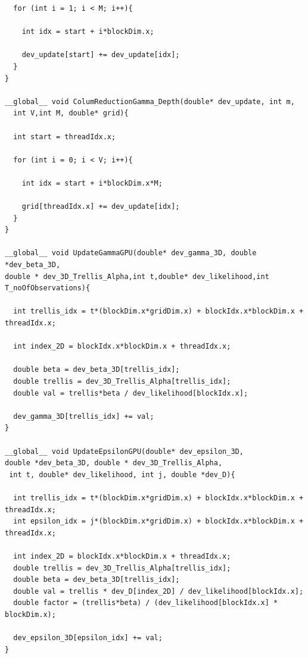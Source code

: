 \documentclass[english, paper=a4]{scrartcl}
\begin{document}
\begin{verbatim}
  for (int i = 1; i < M; i++){

    int idx = start + i*blockDim.x;

    dev_update[start] += dev_update[idx];
  }
}

__global__ void ColumReductionGamma_Depth(double* dev_update, int m,
  int V,int M, double* grid){

  int start = threadIdx.x;
	
  for (int i = 0; i < V; i++){

    int idx = start + i*blockDim.x*M;

    grid[threadIdx.x] += dev_update[idx];
  }
}

__global__ void UpdateGammaGPU(double* dev_gamma_3D, double *dev_beta_3D, 
double * dev_3D_Trellis_Alpha,int t,double* dev_likelihood,int T_noOfObservations){

  int trellis_idx = t*(blockDim.x*gridDim.x) + blockIdx.x*blockDim.x + threadIdx.x;

  int index_2D = blockIdx.x*blockDim.x + threadIdx.x;

  double beta = dev_beta_3D[trellis_idx];
  double trellis = dev_3D_Trellis_Alpha[trellis_idx];
  double val = trellis*beta / dev_likelihood[blockIdx.x];

  dev_gamma_3D[trellis_idx] += val;
}

__global__ void UpdateEpsilonGPU(double* dev_epsilon_3D, 
double *dev_beta_3D, double * dev_3D_Trellis_Alpha,
 int t, double* dev_likelihood, int j, double *dev_D){

  int trellis_idx = t*(blockDim.x*gridDim.x) + blockIdx.x*blockDim.x + threadIdx.x;
  int epsilon_idx = j*(blockDim.x*gridDim.x) + blockIdx.x*blockDim.x + threadIdx.x;

  int index_2D = blockIdx.x*blockDim.x + threadIdx.x;
  double trellis = dev_3D_Trellis_Alpha[trellis_idx];
  double beta = dev_beta_3D[trellis_idx];
  double val = trellis * dev_D[index_2D] / dev_likelihood[blockIdx.x];
  double factor = (trellis*beta) / (dev_likelihood[blockIdx.x] * blockDim.x);

  dev_epsilon_3D[epsilon_idx] += val;
}
\end{verbatim}




\end{document}
